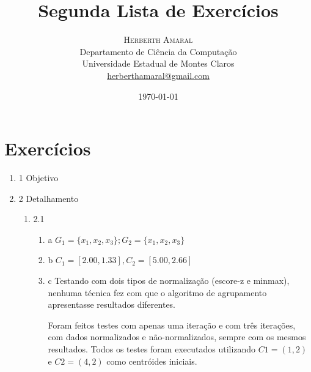 \documentclass[11pt]{article}
\title{\vspace{.5cm}\fontsize{24pt}{10pt}\selectfont\textbf{\sc Segunda Lista de Exercícios}} %
\author{
\large
\textsc{Herberth Amaral}\\[2mm]
\normalsize Departamento de Ciência da Computação \\
\normalsize Universidade Estadual de Montes Claros \\
\normalsize \href{mailto:herberthamaral@gmail.com}{herberthamaral@gmail.com}
\vspace{-5mm}
}
\date{\today}
\begin{document}
\maketitle %

\thispagestyle{fancy} %

\newpage

\section*{Exercícios}

\begin{enumerate}
    \item{1} Objetivo
    \item{2} Detalhamento
        \begin{enumerate}
            \item{2.1}
                \begin{enumerate}
                    \item{a} $G_1 = \{x_1,x_2,x_3\}; G_2 = \{x_1,x_2,x_3\}$
                    \item{b} $C_1 = [2.00, 1.33], C_2=[5.00, 2.66]$
                    \item{c} Testando com dois tipos de normalização (escore-z e minmax), nenhuma
técnica fez com que o algoritmo de agrupamento apresentasse resultados
diferentes. 

Foram feitos testes com apenas uma iteração e com três iterações, com dados
normalizados e não-normalizados, sempre com os mesmos resultados. Todos os
testes foram executados  utilizando $C1 = (1,2)$ e $C2 = (4,2)$ como centróides
iniciais.


\end{enumerate}
\end{enumerate}
\end{enumerate}
\end{document}
